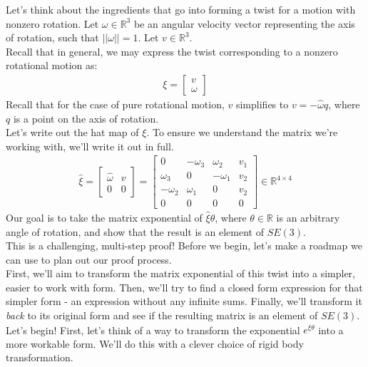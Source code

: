 \documentclass[oneside]{book}
\begin{document}
Let's think about the ingredients that go into forming a twist for a motion with nonzero rotation. Let $\omega \in \mathbb{R}^3$ be an angular velocity vector representing the axis of rotation, such that $||\omega|| = 1$. Let $v \in \mathbb{R}^3$.\\
Recall that in general, we may express the twist corresponding to a nonzero rotational motion as:
\begin{align}
    \xi = \begin{bmatrix}
        v\\
        \omega
    \end{bmatrix}
\end{align}
Recall that for the case of pure rotational motion, $v$ simplifies to $v = -\hat\omega q$, where $q$ is a point on the axis of rotation.\\
Let's write out the hat map of $\xi$. To ensure we understand the matrix we're working with, we'll write it out in full.
\begin{align}
    \hat\xi = 
    \begin{bmatrix}
        \hat\omega & v\\
        0 & 0
    \end{bmatrix}
    = 
    \begin{bmatrix}
    0 & -\omega_3 & \omega_2 & v_1\\
    \omega_3 & 0 & -\omega_1 & v_2\\
    -\omega_2 & \omega_1 & 0 & v_2\\
    0 & 0 & 0 & 0
    \end{bmatrix}
    \in \mathbb{R}^{4\times 4}
\end{align}
Our goal is to take the matrix exponential of $\hat\xi \theta$, where $\theta \in \mathbb{R}$ is an arbitrary angle of rotation, and show that the result is an element of $SE(3)$.\\
This is a challenging, multi-step proof! Before we begin, let's make a roadmap we can use to plan out our proof process.\\
First, we'll aim to transform the matrix exponential of this twist into a simpler, easier to work with form. Then, we'll try to find a closed form expression for that simpler form - an expression without any infinite sums. Finally, we'll transform it \textit{back} to its original form and see if the resulting matrix is an element of $SE(3)$.\\
Let's begin! First, let's think of a way to transform the exponential $e^{\hat\xi \theta}$ into a more workable form. We'll do this with a clever choice of rigid body transformation.\\
\end{document}
